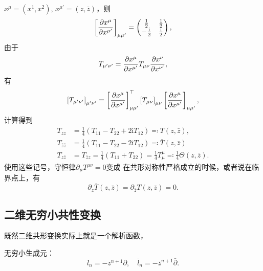 \documentclass[hyperref, UTF8, a4paper]{ctexart}
\newcommand*{\ii}{\mathrm{i}}
\begin{document}
$x^\mu = (x^1, x^2)$, $x^{\mu'} = (z, \bar{z})$，则
\[
    \left[\pdv{x^\mu}{x^{\mu'}}\right]_{\mu \mu'} = \pmqty{\frac{1}{2} & \frac{1}{2} \\ - \frac{\ii}{2} & \frac{\ii}{2}},
\]
由于
\[
    T_{\mu' \nu'} = \pdv{x^\mu}{x^{\mu'}} T_{\mu \nu} \pdv{x^\nu}{x^{\nu'}},
\]
有
\[
    \left[T_{\mu' \nu'}\right]_{\mu' \nu'} = \left[\pdv{x^\mu}{x^{\mu'}}\right]_{\mu \mu'}^\top \left[T_{\mu \nu}\right]_{\mu \nu} \left[\pdv{x^\mu}{x^{\mu'}}\right]_{\mu \mu'},
\]
计算得到
\begin{equation}
    \begin{aligned}
        T_{zz} &= \frac{1}{4} (T_{11} - T_{22} + 2\ii T_{12}) \eqqcolon T(z, \bar{z}) , \\
        T_{\bar{z} \bar{z}} &= \frac{1}{4} (T_{11} - T_{22} - 2\ii T_{12}) \eqqcolon \bar{T}(z, \bar{z}) \\
        T_{z \bar{z}} &= T_{\bar{z} z} = \frac{1}{4} (T_{11} + T_{22}) = \frac{1}{4} T_\mu^\mu \eqqcolon \frac{1}{4} \Theta(z, \bar{z}).
    \end{aligned}
\end{equation}
使用这些记号，守恒律$\partial_\mu T^{\mu \nu} = 0$变成
在共形对称性严格成立的时候，或者说在临界点上，有
\begin{equation}
    \partial_z \bar{T}(z, \bar{z}) = \partial_{\bar{z}} T(z, \bar{z}) = 0.
\end{equation}

\subsection{二维无穷小共性变换}

既然二维共形变换实际上就是一个解析函数，

无穷小生成元：
\begin{equation}
    l_n = - z^{n+1} \partial, \quad \bar{l}_n = - \bar{z}^{n+1} \bar{\partial}.
\end{equation}
\end{document}

